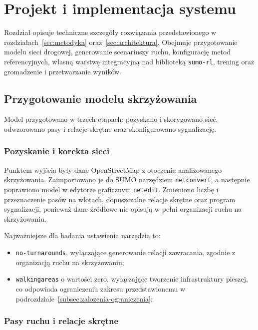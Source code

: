 \clearpage
\section{Projekt i implementacja systemu}
\label{sec:implementacja}

Rozdział opisuje techniczne szczegóły rozwiązania przedstawionego w rozdziałach~\ref{sec:metodyka} oraz~\ref{sec:architektura}. Obejmuje przygotowanie modelu sieci drogowej, generowanie scenariuszy ruchu, konfigurację metod referencyjnych, własną warstwę integracyjną nad biblioteką \texttt{sumo-rl}, trening oraz gromadzenie i przetwarzanie wyników.

\subsection{Przygotowanie modelu skrzyżowania}
\label{subsec:model-skrzyzowania}

Model przygotowano w trzech etapach: pozyskano i skorygowano sieć, odwzorowano pasy i relacje skrętne oraz skonfigurowano sygnalizację.

\subsubsection{Pozyskanie i korekta sieci}
\label{subsubsec:pozyskanie-sieci}

Punktem wyjścia były dane OpenStreetMap z otoczenia analizowanego skrzyżowania. Zaimportowano je do SUMO narzędziem \texttt{netconvert}, a następnie poprawiono model w edytorze graficznym \texttt{netedit}. Zmieniono liczbę i przeznaczenie pasów na wlotach, dopuszczalne relacje skrętne oraz program sygnalizacji, ponieważ dane źródłowe nie opisują w pełni organizacji ruchu na skrzyżowaniu.

Najważniejsze dla badania ustawienia narzędzia to:
\begin{itemize}
    \item \texttt{no-turnarounds}, wyłączające generowanie relacji zawracania, zgodnie z organizacją ruchu na skrzyżowaniu;
    \item \texttt{walkingareas} o wartości zero, wyłączające tworzenie infrastruktury pieszej, co odpowiada ograniczeniu zakresu przedstawionemu w podrozdziale~\ref{subsec:zalozenia-ograniczenia};
\end{itemize}

\subsubsection{Pasy ruchu i relacje skrętne}
\label{subsubsec:pasy-relacje}

